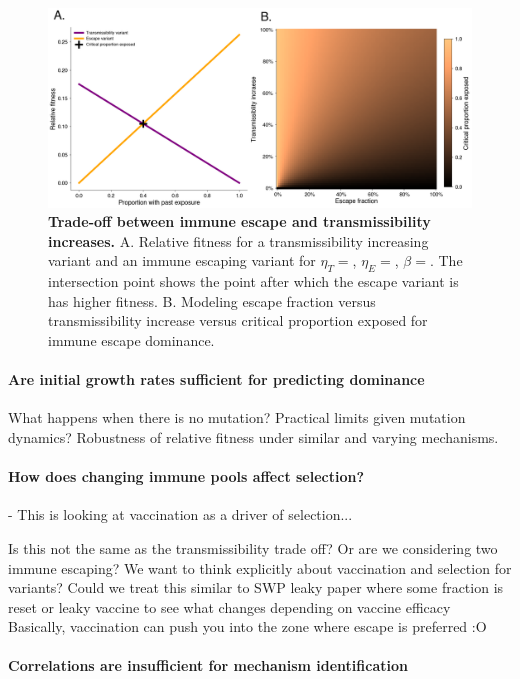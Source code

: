 \documentclass[12pt,oneside,letterpaper]{article}
\begin{document}
\begin{figure}[h]
    \centering
    \includegraphics[width=0.8\linewidth]{../notebooks/figures/transmission_tradeoff.png}
    \caption{\textbf{Trade-off between immune escape and transmissibility increases.} 
    A. Relative fitness for a transmissibility increasing variant and an immune escaping variant for $\eta_{T}=$, $\eta_{E}=$, $\beta=$. 
    The intersection point shows the point after which the escape variant is has higher fitness. 
    B. Modeling escape fraction versus transmissibility increase versus critical proportion exposed for immune escape dominance.}%
    \label{fig:transmission_tradeoff}
\end{figure}

\paragraph{Are initial growth rates sufficient for predicting dominance}%

What happens when there is no mutation? Practical limits given mutation dynamics?
Robustness of relative fitness under similar and varying mechanisms.

\paragraph{How does changing immune pools affect selection?}%
- This is looking at vaccination as a driver of selection...

Is this not the same as the transmissibility trade off? Or are we considering two immune escaping?
We want to think explicitly about vaccination and selection for variants?
Could we treat this similar to SWP leaky paper where some fraction is reset or leaky vaccine to see what changes depending on vaccine efficacy
Basically, vaccination can push you into the zone where escape is preferred :O

\paragraph{Correlations are insufficient for mechanism identification}%
\end{document}
